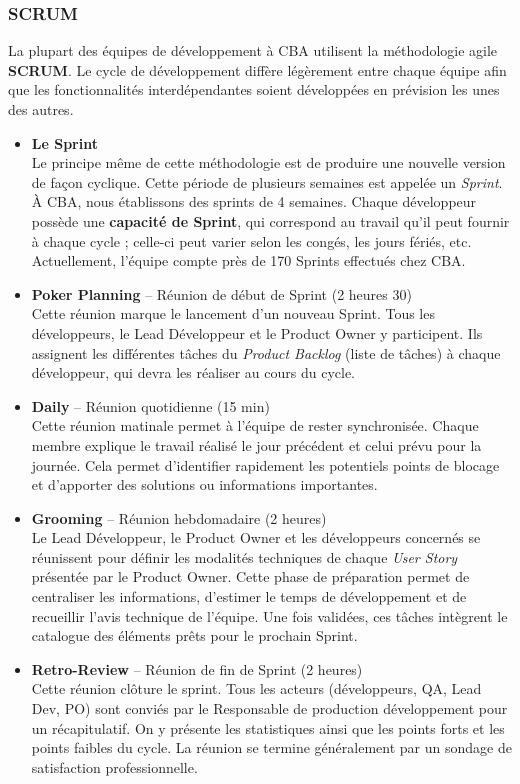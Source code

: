 \documentclass{article}
\begin{document}
\subsubsection{SCRUM}

La plupart des équipes de développement à CBA utilisent la méthodologie agile \textbf{SCRUM}. Le cycle de développement diffère légèrement entre chaque équipe afin que les fonctionnalités interdépendantes soient développées en prévision les unes des autres. 

\begin{itemize}
    \item \textbf{Le Sprint} \\
    Le principe même de cette méthodologie est de produire une nouvelle version de façon cyclique. Cette période de plusieurs semaines est appelée un \textit{Sprint}. À CBA, nous établissons des sprints de 4 semaines. Chaque développeur possède une \textbf{capacité de Sprint}, qui correspond au travail qu'il peut fournir à chaque cycle ; celle-ci peut varier selon les congés, les jours fériés, etc. Actuellement, l'équipe compte près de 170 Sprints effectués chez CBA.

    \item \textbf{Poker Planning} -- Réunion de début de Sprint (2 heures 30) \\
    Cette réunion marque le lancement d'un nouveau Sprint. Tous les développeurs, le Lead Développeur et le Product Owner y participent. Ils assignent les différentes tâches du \textit{Product Backlog} (liste de tâches) à chaque développeur, qui devra les réaliser au cours du cycle.

    \item \textbf{Daily} -- Réunion quotidienne (15 min) \\
    Cette réunion matinale permet à l'équipe de rester synchronisée. Chaque membre explique le travail réalisé le jour précédent et celui prévu pour la journée. Cela permet d'identifier rapidement les potentiels points de blocage et d'apporter des solutions ou informations importantes.

    \item \textbf{Grooming} -- Réunion hebdomadaire (2 heures) \\
    Le Lead Développeur, le Product Owner et les développeurs concernés se réunissent pour définir les modalités techniques de chaque \textit{User Story} présentée par le Product Owner. Cette phase de préparation permet de centraliser les informations, d'estimer le temps de développement et de recueillir l'avis technique de l'équipe. Une fois validées, ces tâches intègrent le catalogue des éléments prêts pour le prochain Sprint.

    \item \textbf{Retro-Review} -- Réunion de fin de Sprint (2 heures) \\
    Cette réunion clôture le sprint. Tous les acteurs (développeurs, QA, Lead Dev, PO) sont conviés par le Responsable de production développement pour un récapitulatif. On y présente les statistiques ainsi que les points forts et les points faibles du cycle. La réunion se termine généralement par un sondage de satisfaction professionnelle.
\end{itemize}
\end{document}

